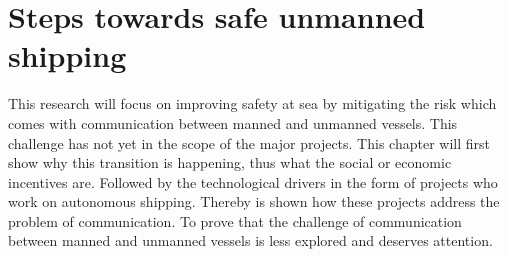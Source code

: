 \chapter{Steps towards safe unmanned shipping}
\label{ch:future}
This research will focus on improving safety at sea by mitigating the risk which comes with communication between manned and unmanned vessels. This challenge has not yet in the scope of the major projects. This chapter will first show why this transition is happening, thus what the social or economic incentives are. Followed by the technological drivers in the form of projects who work on autonomous shipping. Thereby is shown how these projects address the problem of communication. To prove that the challenge of communication between manned and unmanned vessels is less explored and deserves attention.


